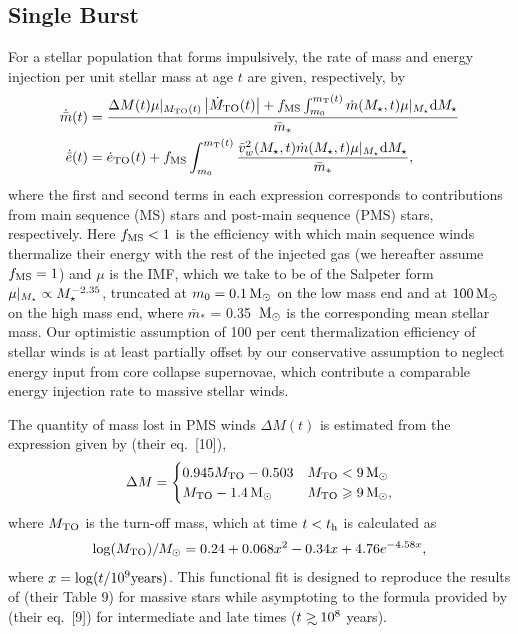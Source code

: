 
\subsection{Single Burst}

For a stellar population that forms impulsively, the rate of mass and energy injection per unit stellar mass at age $t$ are given, respectively, by 
\begin{align} 
  \dot{\bar{m}}(t) &= \frac{\Delta M(t) \mu|_{M_{\rm TO}(t)}
    \left|\dot{M}_{\rm TO}(t)\right| + f_{\rm MS} \int_{m_0}^{m_{\rm
        T}(t)}
    \dot{m}(M_{\star}, t) \mu|_{M_{\star}} {\rm d}M_{\star} }{\bar{m}_*}\\
  \dot{\bar{e}}(t) &=\dot{e}_{\rm TO}(t)+ f_{\rm MS} \int_{m_0}^{m_{\rm T}(t)}
  \frac{\tilde{v}_{w}^2(M_{\star}, t) \dot{m}(M_{\star}, t) \mu|_{M_{\star}} {\rm d}M_{\star}}{\bar{m}_*},
  \label{eq:edotImp}
\end{align} 
where the first and second terms in each expression corresponds to
contributions from main sequence (MS) stars and post-main sequence
(PMS) stars, respectively.  Here $ f_{\rm MS} < 1$ is the efficiency
with which main sequence winds thermalize their energy with the rest
of the injected gas (we hereafter assume $f_{\rm MS} = 1$) and $\mu$
is the IMF, which we take to be of the Salpeter form $\mu|_{M_{\star}}
\propto M_{\star}^{-2.35}$, truncated at $m_0 = 0.1 \,{\rm M_\odot}$ on the low
mass end and at $100 \,{\rm M_\odot}$ on the high mass end, where $\bar{m}_*$ =
0.35 $\,{\rm M_\odot}$ is the corresponding mean stellar mass.  Our optimistic
assumption of 100 per cent thermalization efficiency of stellar winds
is at least partially offset by our conservative assumption to neglect
energy input from core collapse supernovae, which contribute a
comparable energy injection rate to massive stellar winds.

The quantity of mass lost in PMS winds $\Delta M(t)$ is estimated from
the expression given by \citet{CiottiOstriker:2007a} (their eq.~[10]),
\begin{align}
\Delta M=
\begin{cases}
0.945 M_{\rm TO}-0.503 & M_{\rm TO} < 9 \,{\rm M_\odot}\\
 M_{\rm TO}-1.4 \,{\rm M_\odot} &  M_{\rm TO} \geqslant 9 \,{\rm M_\odot},
\end{cases}
\end{align}
where $M_{\rm TO}$ is the turn-off mass, which at time $t < t_{\rm h}$ is calculated as
\begin{align}
\log(M_{\rm TO})/M_{\odot} =0.24 + 0.068 x^2-0.34 x+4.76 e^{-4.58 x},
\end{align}
where $x=\log(t/10^9 {\rm years})$.  This functional fit is designed
to reproduce the results of \citet{MaederMeynet:1987a} (their Table 9)
for massive stars while asymptoting to the formula provided by
\citet{CiottiOstriker:2007a} (their eq.~[9]) for intermediate and late
times ($t \gsim 10^8$ years).

